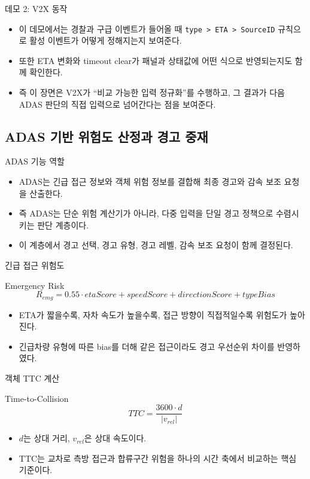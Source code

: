 \documentclass[aspectratio=169,10pt]{beamer}
\begin{document}
\begin{frame}{데모 2: V2X 동작}
\begin{itemize}
  \item 이 데모에서는 경찰과 구급 이벤트가 들어올 때 \texttt{type > ETA > SourceID} 규칙으로 활성 이벤트가 어떻게 정해지는지 보여준다.
  \item 또한 ETA 변화와 timeout clear가 패널과 상태값에 어떤 식으로 반영되는지도 함께 확인한다.
  \item 즉 이 장면은 V2X가 ``비교 가능한 입력 정규화''를 수행하고, 그 결과가 다음 ADAS 판단의 직접 입력으로 넘어간다는 점을 보여준다.
\end{itemize}
\end{frame}

\subsection{ADAS 기반 위험도 산정과 경고 중재}
\begin{frame}{ADAS 기능 역할}
\begin{itemize}
  \item ADAS는 긴급 접근 정보와 객체 위험 정보를 결합해 최종 경고와 감속 보조 요청을 산출한다.
  \item 즉 ADAS는 단순 위험 계산기가 아니라, 다중 입력을 단일 경고 정책으로 수렴시키는 판단 계층이다.
  \item 이 계층에서 경고 선택, 경고 유형, 경고 레벨, 감속 보조 요청이 함께 결정된다.
\end{itemize}
\end{frame}

\begin{frame}{긴급 접근 위험도}
\begin{block}{Emergency Risk}
\[
R_{emg}=0.55\cdot etaScore + speedScore + directionScore + typeBias
\]
\end{block}
\begin{itemize}
  \item ETA가 짧을수록, 자차 속도가 높을수록, 접근 방향이 직접적일수록 위험도가 높아진다.
  \item 긴급차량 유형에 따른 bias를 더해 같은 접근이라도 경고 우선순위 차이를 반영하였다.
\end{itemize}
\end{frame}

\begin{frame}{객체 TTC 계산}
\small
\begin{block}{Time-to-Collision}
\[
TTC=\frac{3600\cdot d}{|v_{rel}|}
\]
\end{block}
\begin{itemize}
  \item \(d\)는 상대 거리, \(v_{rel}\)은 상대 속도이다.
  \item TTC는 교차로 측방 접근과 합류구간 위험을 하나의 시간 축에서 비교하는 핵심 기준이다.
\end{itemize}
\end{frame}
\end{document}

